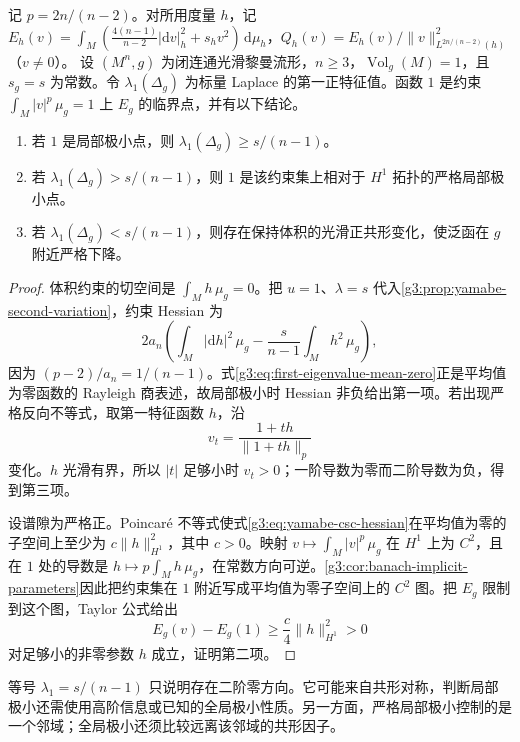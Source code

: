 \begin{proposition}\label{g3:prop:yamabe-csc-stability}
	记 \(p=2n/(n-2)\)。对所用度量 \(h\)，记 \(E_h(v)=\int_M(\tfrac{4(n-1)}{n-2}|\mathrm dv|_h^2+s_hv^2)\,\mathrm d\mu_h\)，\(Q_h(v)=E_h(v)/\|v\|_{L^{2n/(n-2)}(h)}^2\)（\(v\ne0\)）。
	设 \((M^n,g)\) 为闭连通光滑黎曼流形，\(n\ge3\)，\(\operatorname{Vol}_g(M)=1\)，且 \(s_g=s\) 为常数。令 \(\lambda_1(\Delta_g)\) 为标量 Laplace 的第一正特征值。函数 \(1\) 是约束 \(\int_M|v|^p\,\mu_g=1\) 上 \(E_g\) 的临界点，并有以下结论。
	\begin{enumerate}
		\item 若 \(1\) 是局部极小点，则 \(\lambda_1(\Delta_g)\ge s/(n-1)\)。
		\item 若 \(\lambda_1(\Delta_g)>s/(n-1)\)，则 \(1\) 是该约束集上相对于 \(H^1\) 拓扑的严格局部极小点。
		\item 若 \(\lambda_1(\Delta_g)<s/(n-1)\)，则存在保持体积的光滑正共形变化，使泛函在 \(g\) 附近严格下降。
	\end{enumerate}
\end{proposition}
\begin{proof}
	体积约束的切空间是 \(\int_Mh\,\mu_g=0\)。把 \(u=1\)、\(\lambda=s\) 代入\cref{g3:prop:yamabe-second-variation}，约束 Hessian 为
	\begin{equation}\label{g3:eq:yamabe-csc-hessian}
		2a_n\left(\int_M|\mathrm dh|^2\,\mu_g
		-\frac{s}{n-1}\int_Mh^2\,\mu_g\right),
	\end{equation}
	因为 \((p-2)/a_n=1/(n-1)\)。式\eqref{g3:eq:first-eigenvalue-mean-zero}正是平均值为零函数的 Rayleigh 商表述，故局部极小时 Hessian 非负给出第一项。若出现严格反向不等式，取第一特征函数 \(h\)，沿
	\[
		v_t=\frac{1+th}{\|1+th\|_p}
	\]
	变化。\(h\) 光滑有界，所以 \(|t|\) 足够小时 \(v_t>0\)；一阶导数为零而二阶导数为负，得到第三项。

	设谱隙为严格正。Poincar\'e 不等式使式\eqref{g3:eq:yamabe-csc-hessian}在平均值为零的子空间上至少为 \(c\|h\|_{H^1}^2\)，其中 \(c>0\)。映射 \(v\mapsto\int_M|v|^p\,\mu_g\) 在 \(H^1\) 上为 \(C^2\)，且在 \(1\) 处的导数是 \(h\mapsto p\int_Mh\,\mu_g\)，在常数方向可逆。\cref{g3:cor:banach-implicit-parameters}因此把约束集在 \(1\) 附近写成平均值为零子空间上的 \(C^2\) 图。把 \(E_g\) 限制到这个图，Taylor 公式给出
	\[
		E_g(v)-E_g(1)\ge\frac c4\|h\|_{H^1}^2>0
	\]
	对足够小的非零参数 \(h\) 成立，证明第二项。
\end{proof}
等号 \(\lambda_1=s/(n-1)\) 只说明存在二阶零方向。它可能来自共形对称，判断局部极小还需使用高阶信息或已知的全局极小性质。另一方面，严格局部极小控制的是一个邻域；全局极小还须比较远离该邻域的共形因子。

